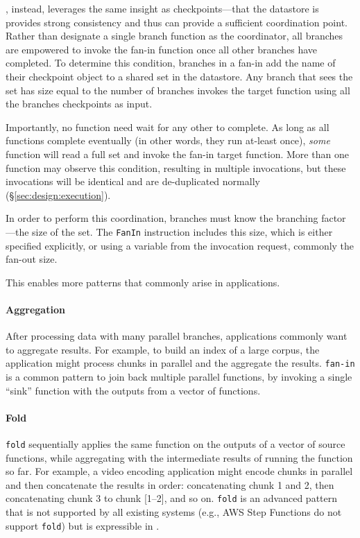 \name{}, instead, leverages the same insight as checkpoints---that the datastore
is provides strong consistency and thus can provide a sufficient coordination
point. Rather than designate a single branch function as the coordinator, all
branches are empowered to invoke the fan-in function once all other branches
have completed. To determine this condition, branches in a fan-in add the name
of their checkpoint object to a shared set in the datastore. Any branch that
sees the set has size equal to the number of branches invokes the target
function using all the branches checkpoints as input.

Importantly, no function need wait for any other to complete. As long as all
functions complete eventually (in other words, they run at-least once),
\emph{some} function will read a full set and invoke the fan-in target function.
More than one function may observe this condition, resulting in multiple
invocations, but these invocations will be identical and are de-duplicated
normally (\S\ref{sec:design:execution}).

In order to perform this coordination, branches must know the branching
factor---the size of the set. The \texttt{FanIn} instruction includes this size,
which is either specified explicitly, or using a variable from the invocation
request, commonly the fan-out size.


This enables more patterns that commonly arise in applications.

\paragraph{Aggregation}
After processing data with many parallel branches, applications commonly want to
aggregate results. For example, to build an index of a large corpus, the
application might process chunks in parallel and the aggregate the results.
\texttt{fan-in} is a common pattern to join back multiple parallel functions, by
invoking a single ``sink'' function with the outputs from a vector of functions.

\paragraph{Fold}
\texttt{fold} sequentially applies the same function on the outputs of a vector
of source functions, while aggregating with the intermediate results of running
the function so far. For example, a video encoding application might encode
chunks in parallel and then concatenate the results in order: concatenating
chunk 1 and 2, then concatenating chunk 3 to chunk [1--2], and so on.
\texttt{fold} is an advanced pattern that is not supported by all existing
systems (e.g., AWS Step Functions do not support \texttt{fold}) but is
expressible in \name{}.


